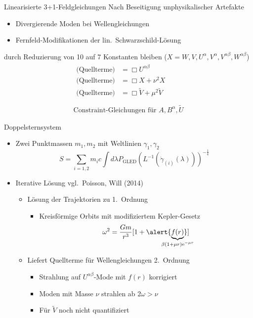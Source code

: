 \documentclass{beamer}
\begin{document}
    \begin{frame}{Linearisierte 3+1-Feldgleichungen}
        Nach Beseitigung unphysikalischer Artefakte
        \begin{itemize}
            \item Divergierende Moden bei Wellengleichungen
            \item Fernfeld-Modifikationen der lin.\ Schwarzschild-Lösung
        \end{itemize}
        durch Reduzierung von 10 auf 7 Konstanten
        bleiben ($X = W,V,U^\alpha,V^\alpha,V^{\alpha\beta},W^{\alpha\beta}$)
        \begin{gather*}
            \begin{aligned}
                \text{(Quellterme)} &= \Box U^{\alpha\beta} \\
                \text{(Quellterme)} &= \Box X + \nu^2 X \\
                \text{(Quellterme)} &= \Box \tilde V + \mu^2 \tilde V \\
            \end{aligned} \\
            \text{Constraint-Gleichungen für }A, B^\alpha, \tilde U
        \end{gather*}
    \end{frame}

    \begin{frame}{Doppelsternsystem}
        \begin{itemize}
            \item Zwei Punktmassen $m_1,m_2$ mit Weltlinien $\gamma_1,\gamma_2$
            \[ S = \sum_{i=1,2} m_i c \int d\lambda P_\text{GLED}(L^{-1}(\dot\gamma_{(i)}(\lambda)))^{-\frac{1}{4}} \] \pause
            \item Iterative Lösung \scriptsize \lbrack vgl.\ Poisson, Will (2014) \rbrack \pause
            \begin{itemize}
                \item Lösung der Trajektorien zu 1.\ Ordnung
                \begin{itemize}
                    \item Kreisförmige Orbits mit \alert{modifiziertem Kepler-Gesetz}
                    \[\omega^2 = \frac{Gm}{r^3}\lbrack 1 + \alert{\underbrace{f(r)}_{\mathclap{\beta(1+\mu r)\mathrm e^{-\mu r}}}} \rbrack \]
                \end{itemize} \pause
                \item Liefert Quellterme für Wellengleichungen 2.\ Ordnung
                \begin{itemize}
                    \item \alert{Strahlung auf $U^{\alpha\beta}$-Mode mit $f(r)$ korrigiert}
                    \item \alert{Moden mit Masse $\nu$ strahlen ab $2\omega > \nu$}
                    \item Für $\tilde V$ noch nicht quantifiziert
                \end{itemize}
            \end{itemize}
        \end{itemize}
    \end{frame}
\end{document}
